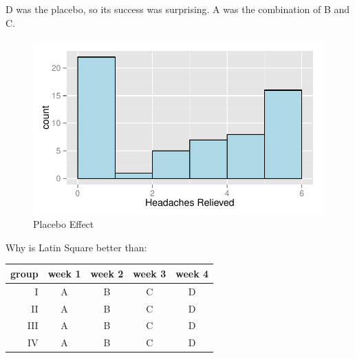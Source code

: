 \documentclass[landscape]{exam}
\begin{document}
  D was the placebo, so its success was surprising.  A was the combination of B
  and C.

  \begin{figure}[H]
    \centering
    \includegraphics{figures/placebo.pdf}
    \caption{Placebo Effect}
    \label{fig:placebo}
  \end{figure}

  Why is Latin Square better than:
  \begin{tabular}[H]{rcccc}
    \toprule
    group & week 1 & week 2 & week 3 & week 4 \\
    \midrule
    I     & A      & B      & C      & D \\
    II    & A      & B      & C      & D \\
    III   & A      & B      & C      & D \\
    IV    & A      & B      & C      & D \\
  \end{tabular}
\end{document}
